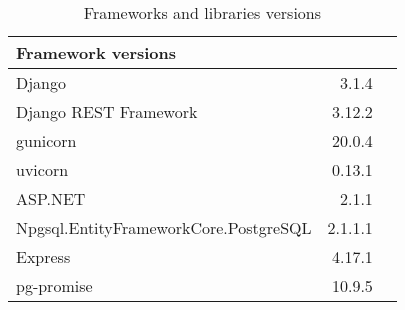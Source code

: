 \begin{table}[!htp]\centering
    \caption{Frameworks and libraries versions}\label{tab:software}
    \scriptsize
    \begin{tabular}{lrr}\toprule
        Framework versions                    &         \\\midrule
        Django                                & 3.1.4   \\
        Django REST Framework                 & 3.12.2  \\
        gunicorn                              & 20.0.4  \\
        uvicorn                               & 0.13.1  \\\midrule
        ASP.NET                               & 2.1.1   \\
        Npgsql.EntityFrameworkCore.PostgreSQL & 2.1.1.1 \\\midrule
        Express                               & 4.17.1  \\
        pg-promise                            & 10.9.5  \\
        \bottomrule
    \end{tabular}
\end{table}

